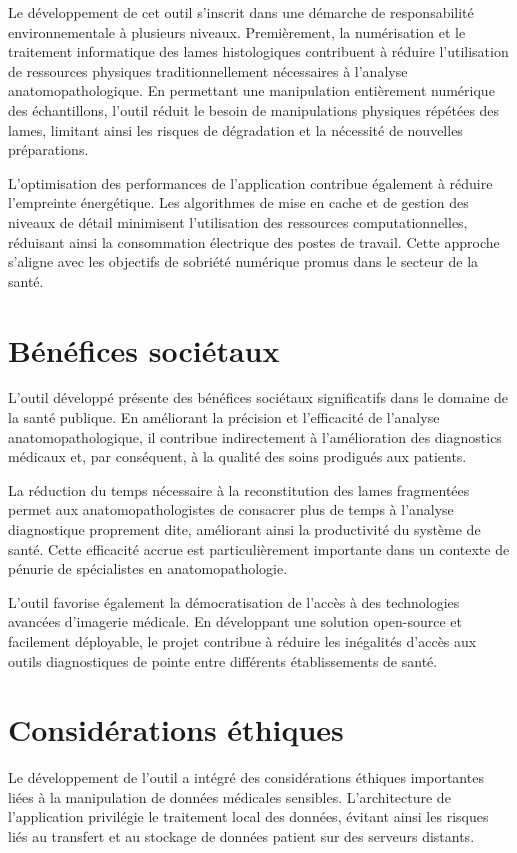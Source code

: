 \documentclass[12pt,a4paper]{report}
\begin{document}
Le développement de cet outil s'inscrit dans une démarche de responsabilité environnementale à plusieurs niveaux. Premièrement, la numérisation et le traitement informatique des lames histologiques contribuent à réduire l'utilisation de ressources physiques traditionnellement nécessaires à l'analyse anatomopathologique. En permettant une manipulation entièrement numérique des échantillons, l'outil réduit le besoin de manipulations physiques répétées des lames, limitant ainsi les risques de dégradation et la nécessité de nouvelles préparations.

L'optimisation des performances de l'application contribue également à réduire l'empreinte énergétique. Les algorithmes de mise en cache et de gestion des niveaux de détail minimisent l'utilisation des ressources computationnelles, réduisant ainsi la consommation électrique des postes de travail. Cette approche s'aligne avec les objectifs de sobriété numérique promus dans le secteur de la santé.

\section{Bénéfices sociétaux}

L'outil développé présente des bénéfices sociétaux significatifs dans le domaine de la santé publique. En améliorant la précision et l'efficacité de l'analyse anatomopathologique, il contribue indirectement à l'amélioration des diagnostics médicaux et, par conséquent, à la qualité des soins prodigués aux patients.

La réduction du temps nécessaire à la reconstitution des lames fragmentées permet aux anatomopathologistes de consacrer plus de temps à l'analyse diagnostique proprement dite, améliorant ainsi la productivité du système de santé. Cette efficacité accrue est particulièrement importante dans un contexte de pénurie de spécialistes en anatomopathologie.

L'outil favorise également la démocratisation de l'accès à des technologies avancées d'imagerie médicale. En développant une solution open-source et facilement déployable, le projet contribue à réduire les inégalités d'accès aux outils diagnostiques de pointe entre différents établissements de santé.

\section{Considérations éthiques}

Le développement de l'outil a intégré des considérations éthiques importantes liées à la manipulation de données médicales sensibles. L'architecture de l'application privilégie le traitement local des données, évitant ainsi les risques liés au transfert et au stockage de données patient sur des serveurs distants.
\end{document}
